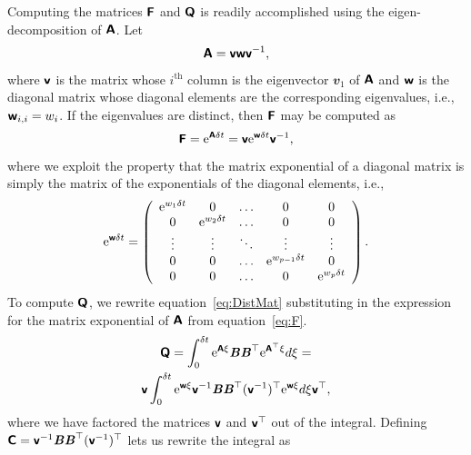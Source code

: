 \documentclass[a4paper,fleqn,usenatbib]{mnras}
\begin{document}
Computing the matrices $\textbf{\textsf{F}}$ and $\textbf{\textsf{Q}}$ is readily accomplished using the eigen-decomposition of $\textbf{\textsf{A}}$. Let
\begin{equation}
\textbf{\textsf{A}} = \textbf{\textsf{v}}\textbf{\textsf{w}}\textbf{\textsf{v}}^{-1},
\end{equation}
where $\textbf{\textsf{v}}$ is the matrix whose $i^{\mathrm{th}}$ column is the eigenvector $\mathbfit{v}_{1}$ of $\textbf{\textsf{A}}$ and $\textbf{\textsf{w}}$ is the diagonal matrix whose diagonal elements are the corresponding eigenvalues, i.e., $\textbf{\textsf{w}}_{i,i} = w_{i}$. If the eigenvalues are distinct, then $\textbf{\textsf{F}}$ may be computed as
\begin{equation}\label{eq:F}
\textbf{\textsf{F}} = \mathrm{e}^{\textbf{\textsf{A}}\delta t} = \textbf{\textsf{v}}\mathrm{e}^{\textbf{\textsf{w}}\delta t}\textbf{\textsf{v}}^{-1},
\end{equation}
where we exploit the property that the matrix exponential of a diagonal matrix is simply the matrix of the exponentials of the diagonal elements, i.e.,
\begin{equation}\label{eq:MatrixExp}
\mathrm{e}^{\textbf{\textsf{w}}\delta t} = \left( \begin{array}{ccccc}
\mathrm{e}^{w_{1} \delta t} & 0 & \hdots & 0 & 0 \\
0 & \mathrm{e}^{w_{2} \delta t} & \hdots & 0 & 0 \\
\vdots & \vdots & \ddots & \vdots & \vdots \\
0 & 0 & \hdots & \mathrm{e}^{w_{p-1} \delta t} & 0 \\
0 & 0 & \hdots & 0 & \mathrm{e}^{w_{p} \delta t} \\
\end{array}\right).
\end{equation}
To compute $\textbf{\textsf{Q}}$, we rewrite equation~\ref{eq:DistMat} substituting in the expression for the matrix exponential of $\textbf{\textsf{A}}$ from equation~\ref{eq:F}.
\begin{multline}\label{eq:DistMat2}
\textbf{\textsf{Q}} = \int_{0}^{\delta t} \mathrm{e}^{\textbf{\textsf{A}}\xi}\textbf{\textit{B}}\textbf{\textit{B}}^{\top}\mathrm{e}^{\textbf{\textsf{A}}^{\top}\xi} d\xi = \\ \textbf{\textsf{v}} \int_{0}^{\delta t} \mathrm{e}^{\textbf{\textsf{w}}\xi}\textbf{\textsf{v}}^{-1}\textbf{\textit{B}}\textbf{\textit{B}}^{\top}(\textbf{\textsf{v}}^{-1})^{\top} \mathrm{e}^{\textbf{\textsf{w}}\xi} d\xi \textbf{\textsf{v}}^{\top},
\end{multline}
where we have factored the matrices $\textbf{\textsf{v}}$ and $\textbf{\textsf{v}}^{\top}$ out of the integral. Defining $\textbf{\textsf{C}} = \textbf{\textsf{v}}^{-1}\textbf{\textit{B}}\textbf{\textit{B}}^{\top}(\textbf{\textsf{v}}^{-1})^{\top}$ lets us rewrite the integral as
\end{document}
